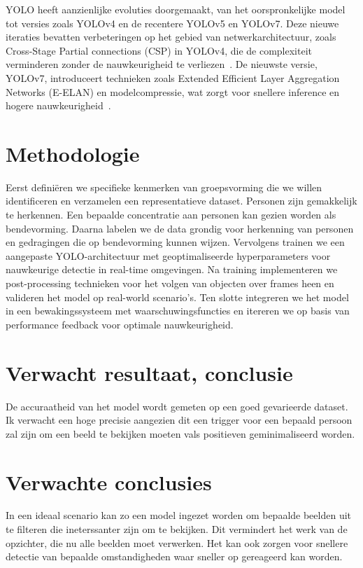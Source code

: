 YOLO heeft aanzienlijke evoluties doorgemaakt, van het oorspronkelijke model tot versies zoals YOLOv4 en de recentere YOLOv5 en YOLOv7.
Deze nieuwe iteraties bevatten verbeteringen op het gebied van netwerkarchitectuur, zoals Cross-Stage Partial connections (CSP) in YOLOv4,
die de complexiteit verminderen zonder de nauwkeurigheid te verliezen~\autocite{DBLP:journals/corr/abs-2004-10934}.
De nieuwste versie, YOLOv7, introduceert technieken zoals Extended Efficient Layer Aggregation Networks (E-ELAN) en modelcompressie,
wat zorgt voor snellere inference en hogere nauwkeurigheid~\autocite{wang2022yolov7trainablebagoffreebiessets}.


\section{Methodologie}%
\label{sec:methodologie}

Eerst definiëren we specifieke kenmerken van groepsvorming die we willen identificeren en verzamelen een representatieve dataset.
Personen zijn gemakkelijk te herkennen.
Een bepaalde concentratie aan personen kan gezien worden als bendevorming.
Daarna labelen we de data grondig voor herkenning van personen en gedragingen die op bendevorming kunnen wijzen.
Vervolgens trainen we een aangepaste YOLO-architectuur met geoptimaliseerde hyperparameters voor nauwkeurige detectie in real-time omgevingen.
Na training implementeren we post-processing technieken voor het volgen van objecten over frames heen en valideren het model op real-world scenario's.
Ten slotte integreren we het model in een bewakingssysteem met waarschuwingsfuncties en itereren we op basis van performance feedback voor optimale nauwkeurigheid.




\section{Verwacht resultaat, conclusie}%
\label{sec:verwachte_resultaten}
De accuraatheid van het model wordt gemeten op een goed gevarieerde dataset.
Ik verwacht een hoge precisie aangezien dit een trigger voor een bepaald persoon zal zijn om een beeld te bekijken moeten vals positieven geminimaliseerd worden.


\section{Verwachte conclusies}
\label{sec:verwachte_conclusies}
In een ideaal scenario kan zo een model ingezet worden om bepaalde beelden uit te filteren die ineterssanter zijn om te bekijken.
Dit vermindert het werk van de opzichter, die nu alle beelden moet verwerken.
Het kan ook zorgen voor snellere detectie van bepaalde omstandigheden waar sneller op gereageerd kan worden.